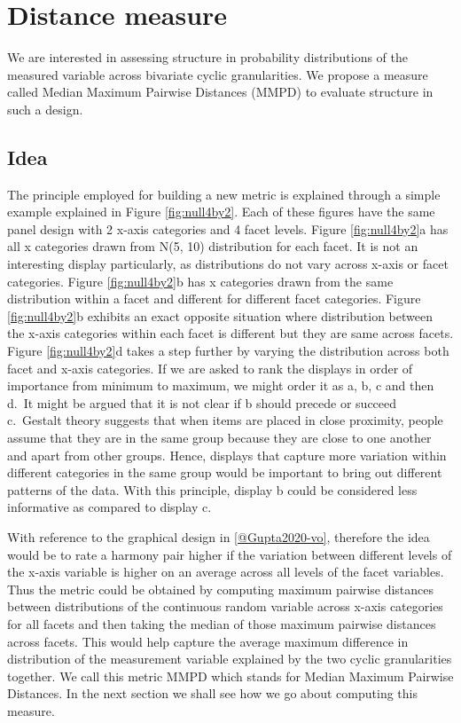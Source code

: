 \documentclass[
]{article}
\begin{document}
\hypertarget{distance-measure}{%
\section{Distance measure}\label{distance-measure}}

We are interested in assessing structure in probability distributions of the measured variable across bivariate cyclic granularities. We propose a measure called Median Maximum Pairwise Distances (MMPD) to evaluate structure in such a design.

\hypertarget{sec:idea}{%
\subsection{Idea}\label{sec:idea}}

The principle employed for building a new metric is explained through a simple example explained in Figure \ref{fig:null4by2}. Each of these figures have the same panel design with 2 x-axis categories and 4 facet levels. Figure \ref{fig:null4by2}a has all x categories drawn from N(5, 10) distribution for each facet. It is not an interesting display particularly, as distributions do not vary across x-axis or facet categories. Figure \ref{fig:null4by2}b has x categories drawn from the same distribution within a facet and different for different facet categories. Figure \ref{fig:null4by2}b exhibits an exact opposite situation where distribution between the x-axis categories within each facet is different but they are same across facets. Figure \ref{fig:null4by2}d takes a step further by varying the distribution across both facet and x-axis categories. If we are asked to rank the displays in order of importance from minimum to maximum, we might order it as a, b, c and then d.~It might be argued that it is not clear if b should precede or succeed c.~Gestalt theory suggests that when items are placed in close proximity, people assume that they are in the same group because they are close to one another and apart from other groups. Hence, displays that capture more variation within different categories in the same group would be important to bring out different patterns of the data. With this principle, display b could be considered less informative as compared to display c.

With reference to the graphical design in \ref{@Gupta2020-vo}, therefore the idea would be to rate a harmony pair higher if the variation between different levels of the x-axis variable is higher on an average across all levels of the facet variables. Thus the metric could be obtained by computing maximum pairwise distances between distributions of the continuous random variable across x-axis categories for all facets and then taking the median of those maximum pairwise distances across facets. This would help capture the average maximum difference in distribution of the measurement variable explained by the two cyclic granularities together. We call this metric MMPD which stands for Median Maximum Pairwise Distances. In the next section we shall see how we go about computing this measure.
\end{document}
